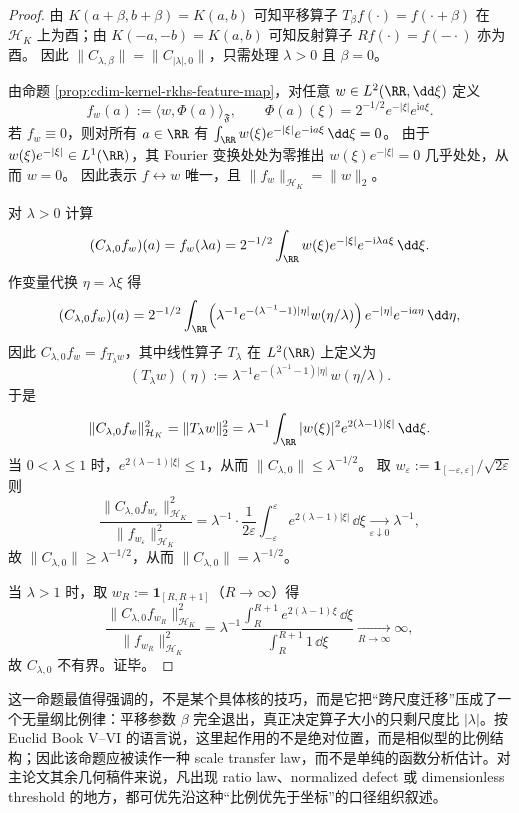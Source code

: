 \begin{proof}
由 \(K(a+\beta,b+\beta)=K(a,b)\) 可知平移算子 \(T_\beta f(\cdot)=f(\cdot+\beta)\) 在 \(\mathcal H_K\) 上为酉；由 \(K(-a,-b)=K(a,b)\) 可知反射算子 \(Rf(\cdot)=f(-\cdot)\) 亦为酉。
因此 \(\|C_{\lambda,\beta}\|=\|C_{|\lambda|,0}\|\)，只需处理 \(\lambda>0\) 且 \(\beta=0\)。
\par
由命题 \ref{prop:cdim-kernel-rkhs-feature-map}，对任意 \(w\in L^2(\RR,\dd\xi)\) 定义
\[
f_w(a):=\langle w,\Phi(a)\rangle_{\mathfrak F},
\qquad
\Phi(a)(\xi)=2^{-1/2}e^{-|\xi|}e^{\mathrm{i}a\xi}.
\]
若 \(f_w\equiv 0\)，则对所有 \(a\in\RR\) 有
\(
\int_{\RR}w(\xi)e^{-|\xi|}e^{-\mathrm{i}a\xi}\,\dd\xi=0
\)。
由于 \(w(\xi)e^{-|\xi|}\in L^1(\RR)\)，其 Fourier 变换处处为零推出 \(w(\xi)e^{-|\xi|}=0\) 几乎处处，从而 \(w=0\)。
因此表示 \(f\leftrightarrow w\) 唯一，且 \(\|f_w\|_{\mathcal H_K}=\|w\|_{2}\)。
\par
对 \(\lambda>0\) 计算
\[
(C_{\lambda,0}f_w)(a)=f_w(\lambda a)
=2^{-1/2}\int_{\RR}w(\xi)e^{-|\xi|}e^{-\mathrm{i}\lambda a\xi}\,\dd\xi.
\]
作变量代换 \(\eta=\lambda\xi\) 得
\[
(C_{\lambda,0}f_w)(a)
=2^{-1/2}\int_{\RR}\Bigl(\lambda^{-1}e^{-(\lambda^{-1}-1)|\eta|}w(\eta/\lambda)\Bigr)\,e^{-|\eta|}e^{-\mathrm{i}a\eta}\,\dd\eta,
\]
因此 \(C_{\lambda,0}f_w=f_{T_\lambda w}\)，其中线性算子 \(T_\lambda\) 在 \(L^2(\RR)\) 上定义为
\[
(T_\lambda w)(\eta):=\lambda^{-1}e^{-(\lambda^{-1}-1)|\eta|}\,w(\eta/\lambda).
\]
于是
\[
\|C_{\lambda,0}f_w\|_{\mathcal H_K}^2
=\|T_\lambda w\|_2^2
=\lambda^{-1}\int_{\RR}|w(\xi)|^2e^{2(\lambda-1)|\xi|}\,\dd\xi.
\]
当 \(0<\lambda\le 1\) 时，\(e^{2(\lambda-1)|\xi|}\le 1\)，从而
\(
\|C_{\lambda,0}\|\le \lambda^{-1/2}
\)。
取 \(w_\varepsilon:=\mathbf 1_{[-\varepsilon,\varepsilon]}/\sqrt{2\varepsilon}\) 则
\[
\frac{\|C_{\lambda,0}f_{w_\varepsilon}\|_{\mathcal H_K}^2}{\|f_{w_\varepsilon}\|_{\mathcal H_K}^2}
=\lambda^{-1}\cdot\frac{1}{2\varepsilon}\int_{-\varepsilon}^{\varepsilon}e^{2(\lambda-1)|\xi|}\,\dd\xi
\xrightarrow[\varepsilon\downarrow 0]{}\lambda^{-1},
\]
故 \(\|C_{\lambda,0}\|\ge \lambda^{-1/2}\)，从而 \(\|C_{\lambda,0}\|=\lambda^{-1/2}\)。
\par
当 \(\lambda>1\) 时，取 \(w_R:=\mathbf 1_{[R,R+1]}\)（\(R\to\infty\)）得
\[
\frac{\|C_{\lambda,0}f_{w_R}\|_{\mathcal H_K}^2}{\|f_{w_R}\|_{\mathcal H_K}^2}
=\lambda^{-1}\frac{\int_{R}^{R+1}e^{2(\lambda-1)\xi}\,\dd\xi}{\int_{R}^{R+1}1\,\dd\xi}
\xrightarrow[R\to\infty]{}\infty,
\]
故 \(C_{\lambda,0}\) 不有界。证毕。
\end{proof}

\begin{remark}
这一命题最值得强调的，不是某个具体核的技巧，而是它把“跨尺度迁移”压成了一个无量纲比例律：平移参数 \(\beta\) 完全退出，真正决定算子大小的只剩尺度比 \(|\lambda|\)。按 Euclid Book V--VI 的语言说，这里起作用的不是绝对位置，而是相似型的比例结构；因此该命题应被读作一种 scale transfer law，而不是单纯的函数分析估计。对主论文其余几何稿件来说，凡出现 ratio law、normalized defect 或 dimensionless threshold 的地方，都可优先沿这种“比例优先于坐标”的口径组织叙述。
\end{remark}

